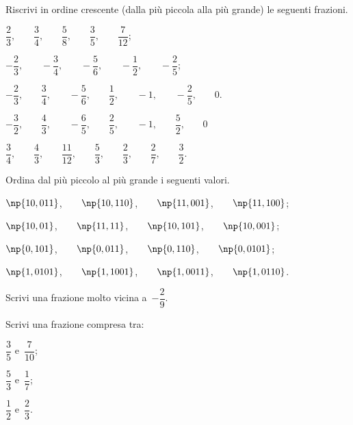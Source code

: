 \begin{esercizio}
 \label{ese:3.37}
Riscrivi in ordine crescente (dalla più piccola alla più grande) le seguenti frazioni.
\begin{enumeratea}
\item $\dfrac{2}{3}\text{,}\qquad\dfrac{3}{4}\text{,}\qquad\dfrac{5}{8}\text{,}\qquad\dfrac{3}{5}\text{,}\qquad\dfrac{7}{12}$;
\item $-\dfrac{2}{3}\text{,}\qquad-\dfrac{3}{4}\text{,}\qquad-\dfrac{5}{6}\text{,}\qquad-\dfrac{1}{2}\text{,}\qquad-\dfrac{2}{5}$;
\item $-\dfrac{2}{3}\text{,}\qquad\dfrac{3}{4}\text{,}\qquad-\dfrac{5}{6}\text{,}\qquad\dfrac{1}{2}\text{,}\qquad-1\text{,}\qquad-\dfrac{2}{5}\text{,}\qquad0.$
\item $-\dfrac{3}{2}\text{,}\qquad\dfrac{4}{3}\text{,}\qquad-\dfrac{6}{5}\text{,}\qquad\dfrac{2}{5}\text{,}\qquad-1\text{,}\qquad\dfrac{5}{2}\text{,}\qquad0$
\item $\dfrac{3}{4}\text{,}\qquad\dfrac{4}{3}\text{,}\qquad\dfrac{11}{12}\text{,}\qquad\dfrac{5}{3}\text{,}\qquad\dfrac{2}{3}\text{,}\qquad\dfrac{2}{7}\text{,}\qquad\dfrac{3}{2}$.
\end{enumeratea}
\end{esercizio}

\begin{esercizio}
 \label{ese:3.38}
Ordina dal più piccolo al più grande i seguenti valori.
\begin{enumeratea}
\item $\np{10,011}$,$\qquad\np{10,110}$,$\qquad\np{11,001}$,$\qquad\np{11,100}$;
\item $\np{10,01}$,$\qquad\np{11,11}$,$\qquad\np{10,101}$,$\qquad\np{10,001}$;
\item $\np{0,101}$,$\qquad\np{0,011}$,$\qquad\np{0,110}$,$\qquad\np{0,0101}$;
\item $\np{1,0101}$,$\qquad\np{1,1001}$,$\qquad\np{1,0011}$,$\qquad\np{1,0110}$.
\end{enumeratea}
\end{esercizio}

\begin{esercizio}
\label{ese:3.39}
Scrivi una frazione molto vicina a~$-\dfrac{2}{9}.$
\end{esercizio}

\begin{esercizio}
\label{ese:3.40}
Scrivi una frazione compresa tra:
\begin{multicols}{3}
\begin{enumeratea}
\item $\dfrac{3}{5}$ e~$\dfrac{7}{10}$;
\item $\dfrac{5}{3}$ e~$\dfrac{1}{7}$;
\item $\dfrac{1}{2}$ e~$\dfrac{2}{3}$.
\end{enumeratea}
\end{multicols}
\end{esercizio}

